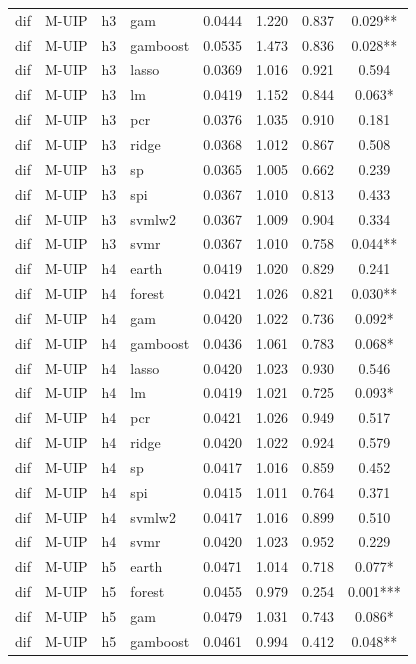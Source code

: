 \begin{ThreePartTable}
\begin{longtable}[t]{llclcccc}
dif & M-UIP & h3 & gam & 0.0444 & 1.220 & 0.837 & 0.029**\\
dif & M-UIP & h3 & gamboost & 0.0535 & 1.473 & 0.836 & 0.028**\\
dif & M-UIP & h3 & lasso & 0.0369 & 1.016 & 0.921 & 0.594\\
dif & M-UIP & h3 & lm & 0.0419 & 1.152 & 0.844 & 0.063*\\
dif & M-UIP & h3 & pcr & 0.0376 & 1.035 & 0.910 & 0.181\\
dif & M-UIP & h3 & ridge & 0.0368 & 1.012 & 0.867 & 0.508\\
dif & M-UIP & h3 & sp & 0.0365 & 1.005 & 0.662 & 0.239\\
dif & M-UIP & h3 & spi & 0.0367 & 1.010 & 0.813 & 0.433\\
dif & M-UIP & h3 & svmlw2 & 0.0367 & 1.009 & 0.904 & 0.334\\
dif & M-UIP & h3 & svmr & 0.0367 & 1.010 & 0.758 & 0.044**\\
\addlinespace
dif & M-UIP & h4 & earth & 0.0419 & 1.020 & 0.829 & 0.241\\
dif & M-UIP & h4 & forest & 0.0421 & 1.026 & 0.821 & 0.030**\\
dif & M-UIP & h4 & gam & 0.0420 & 1.022 & 0.736 & 0.092*\\
dif & M-UIP & h4 & gamboost & 0.0436 & 1.061 & 0.783 & 0.068*\\
dif & M-UIP & h4 & lasso & 0.0420 & 1.023 & 0.930 & 0.546\\
dif & M-UIP & h4 & lm & 0.0419 & 1.021 & 0.725 & 0.093*\\
dif & M-UIP & h4 & pcr & 0.0421 & 1.026 & 0.949 & 0.517\\
dif & M-UIP & h4 & ridge & 0.0420 & 1.022 & 0.924 & 0.579\\
dif & M-UIP & h4 & sp & 0.0417 & 1.016 & 0.859 & 0.452\\
dif & M-UIP & h4 & spi & 0.0415 & 1.011 & 0.764 & 0.371\\
dif & M-UIP & h4 & svmlw2 & 0.0417 & 1.016 & 0.899 & 0.510\\
dif & M-UIP & h4 & svmr & 0.0420 & 1.023 & 0.952 & 0.229\\
\addlinespace
dif & M-UIP & h5 & earth & 0.0471 & 1.014 & 0.718 & 0.077*\\
dif & M-UIP & h5 & forest & 0.0455 & 0.979 & 0.254 & 0.001***\\
dif & M-UIP & h5 & gam & 0.0479 & 1.031 & 0.743 & 0.086*\\
dif & M-UIP & h5 & gamboost & 0.0461 & 0.994 & 0.412 & 0.048**\\

\end{longtable}
\end{ThreePartTable}
